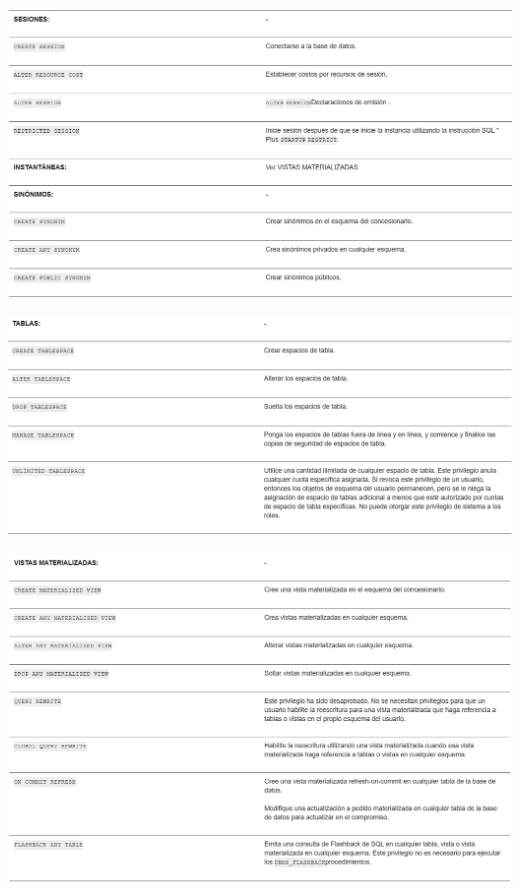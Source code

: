 \documentclass[12pt,letterpaper]{article}
\begin{document}
\begin{center}
  \includegraphics[width=14cm]{Imagenes/Privilegios_sesionessinonimos.png}\\
\end{center}

\begin{center}
  \includegraphics[width=14cm]{Imagenes/Privilegios_tablas.png}\\
\end{center}

\begin{center}
  \includegraphics[width=14cm]{Imagenes/Privilegios_vistasmaterializadas.png}\\
\end{center}
\end{document}
